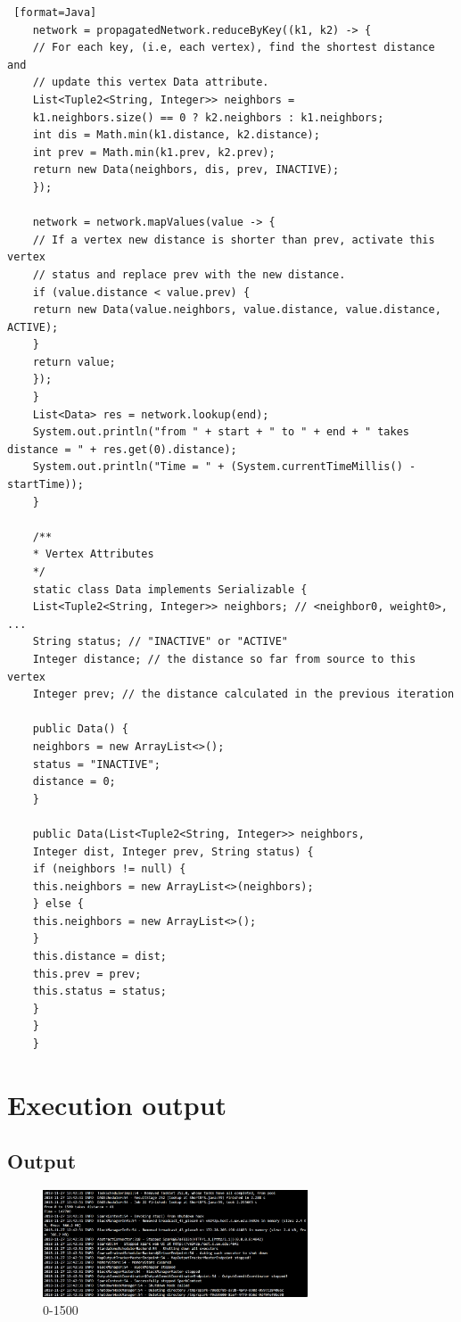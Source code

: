 \documentclass[11pt, letterpaper]{article}
\begin{document}
\begin{lstlisting} [format=Java]
	network = propagatedNetwork.reduceByKey((k1, k2) -> {
	// For each key, (i.e, each vertex), find the shortest distance and
	// update this vertex Data attribute.
	List<Tuple2<String, Integer>> neighbors =
	k1.neighbors.size() == 0 ? k2.neighbors : k1.neighbors;
	int dis = Math.min(k1.distance, k2.distance);
	int prev = Math.min(k1.prev, k2.prev);
	return new Data(neighbors, dis, prev, INACTIVE);
	});
	
	network = network.mapValues(value -> {
	// If a vertex new distance is shorter than prev, activate this vertex
	// status and replace prev with the new distance.
	if (value.distance < value.prev) {
	return new Data(value.neighbors, value.distance, value.distance, ACTIVE);
	}
	return value;
	});
	}
	List<Data> res = network.lookup(end);
	System.out.println("from " + start + " to " + end + " takes distance = " + res.get(0).distance);
	System.out.println("Time = " + (System.currentTimeMillis() - startTime));
	}
	
	/**
	* Vertex Attributes
	*/
	static class Data implements Serializable {
	List<Tuple2<String, Integer>> neighbors; // <neighbor0, weight0>, ...
	String status; // "INACTIVE" or "ACTIVE"
	Integer distance; // the distance so far from source to this vertex
	Integer prev; // the distance calculated in the previous iteration
	
	public Data() {
	neighbors = new ArrayList<>();
	status = "INACTIVE";
	distance = 0;
	}
	
	public Data(List<Tuple2<String, Integer>> neighbors,
	Integer dist, Integer prev, String status) {
	if (neighbors != null) {
	this.neighbors = new ArrayList<>(neighbors);
	} else {
	this.neighbors = new ArrayList<>();
	}
	this.distance = dist;
	this.prev = prev;
	this.status = status;
	}
	}
	}
	\end{lstlisting}
	\pagebreak
	
	
	\section {Execution output}

	\subsection{Output}
	
	\begin{figure}[h]
		\centering
		\includegraphics[width=0.7\textwidth]{1500}
		\caption{0-1500}
	\end{figure}
\end{document}
